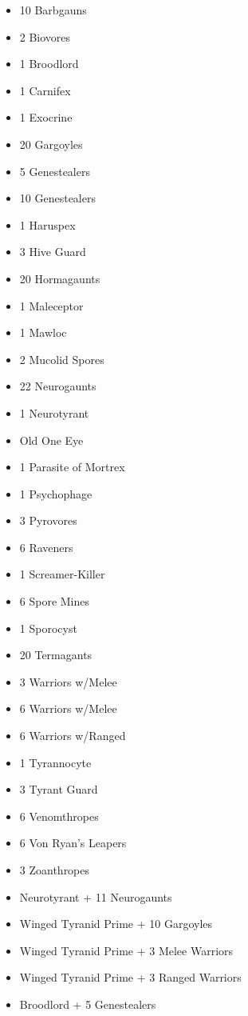 \documentclass{HordeModeTarot}
\begin{document}
\begin{multicols}{2}
\begin{itemize}[leftmargin=*]
\item[] 10 Barbgauns
\item[] 2 Biovores
\item[] 1 Broodlord
\item[] 1 Carnifex
\item[] 1 Exocrine
\item[] 20 Gargoyles
\item[] 5 Genestealers
\item[] 10 Genestealers
\item[] 1 Haruspex
\item[] 3 Hive Guard
\item[] 20 Hormagaunts
\item[] 1 Maleceptor
\item[] 1 Mawloc
\item[] 2 Mucolid Spores
\item[] 22 Neurogaunts
\item[] 1 Neurotyrant
\item[] Old One Eye
\item[] 1 Parasite of Mortrex
\item[] 1 Psychophage
\item[] 3 Pyrovores
\item[] 6 Raveners
\item[] 1 Screamer-Killer
\item[] 6 Spore Mines
\item[] 1 Sporocyst
\item[] 20 Termagants
\item[] 3 Warriors w/Melee
\item[] 6 Warriors w/Melee
\item[] 6 Warriors w/Ranged
\item[] 1 Tyrannocyte
\item[] 3 Tyrant Guard
\item[] 6 Venomthropes
\item[] 6 Von Ryan's Leapers
\item[] 3 Zoanthropes
\item[] Neurotyrant + 11 Neurogaunts
\item[] Winged Tyranid Prime + 10 Gargoyles
\item[] Winged Tyranid Prime + 3 Melee Warriors
\item[] Winged Tyranid Prime + 3 Ranged Warriors
\item[] Broodlord + 5 Genestealers
\end{itemize}


\end{multicols}
\end{document}
